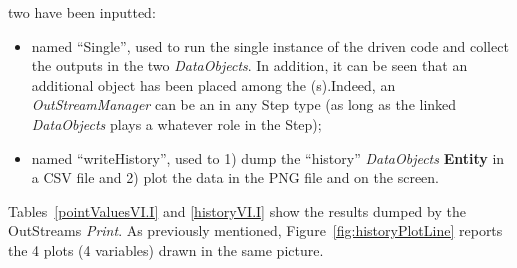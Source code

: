 \begin{enumerate}
   two  have been inputted:
   \begin{itemize}
     \item {} named ``Single'', used to run the single instance of the driven code and collect 
     the outputs in the two \textit{DataObjects}. In addition, it can be seen that an additional object has been  
     placed among the (s).Indeed, an  \textit{OutStreamManager} can be an  in 
     any Step type (as long as the linked \textit{DataObjects} plays a whatever role in the Step);
     \item  {} named ``writeHistory'', used to 1) dump the ``history'' \textit{DataObjects} 
     \textbf{Entity} in a CSV file and 2) plot the data in the PNG file and on the screen.
   \end{itemize}
\end{enumerate} 
 Tables~\ref{pointValuesVI.I} and \ref{historyVI.I} show the results dumped by the OutStreams \textit{Print}.
 As previously mentioned, Figure~\ref{fig:historyPlotLine} reports the 4 plots (4 variables) drawn in the same picture. 
